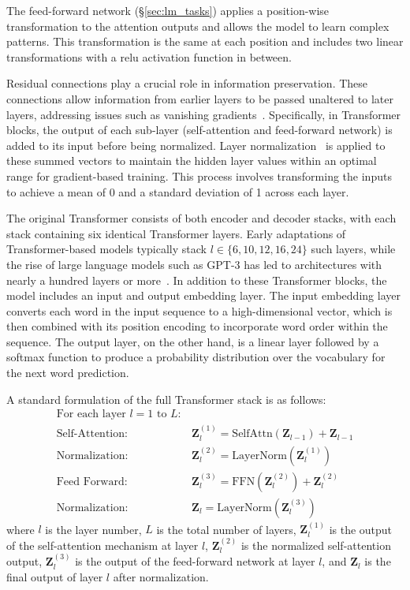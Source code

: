 The feed-forward network (\S\ref{sec:lm_tasks}) applies a position-wise transformation to the attention outputs and allows the model to learn complex patterns. This transformation is the same at each position and includes two linear transformations with a relu activation function in between.

Residual connections play a crucial role in information preservation. These connections allow information from earlier layers to be passed unaltered to later layers, addressing issues such as vanishing gradients~\citep{he2016deep}. Specifically, in Transformer blocks, the output of each sub-layer (self-attention and feed-forward network) is added to its input before being normalized. Layer normalization~\citep{ba2016layer} is applied to these summed vectors to maintain the hidden layer values within an optimal range for gradient-based training. This process involves transforming the inputs to achieve a mean of 0 and a standard deviation of 1 across each layer.


The original Transformer consists of both encoder and decoder stacks, with each stack containing six identical Transformer layers. Early adaptations of Transformer-based models typically stack $l \in \{6, 10,12,16,24\}$ such layers, while the rise of large language models such as GPT-3 has led to architectures with nearly a hundred layers or more~\citep{brown2020language,openai2023gpt4}. In addition to these Transformer blocks, the model includes an input and output embedding layer. The input embedding layer converts each word in the input sequence to a high-dimensional vector, which is then combined with its position encoding to incorporate word order within the sequence. The output layer, on the other hand, is a linear layer followed by a softmax function to produce a probability distribution over the vocabulary for the next word prediction.

A standard formulation of the full Transformer stack is as follows:
\begin{align}
\text{For each layer } l = 1 \text{ to } L:& \nonumber \\
\text{Self-Attention: } & \mathbf{Z}_l^{(1)} = \text{SelfAttn}(\mathbf{Z}_{l-1}) + \mathbf{Z}_{l-1} \nonumber \\
\text{Normalization: } & \mathbf{Z}_l^{(2)} = \text{LayerNorm}(\mathbf{Z}_l^{(1)}) \nonumber \\
\text{Feed Forward: } & \mathbf{Z}_l^{(3)} = \text{FFN}(\mathbf{Z}_l^{(2)}) + \mathbf{Z}_l^{(2)} \nonumber \\
\text{Normalization: } & \mathbf{Z}_l = \text{LayerNorm}(\mathbf{Z}_l^{(3)})
\end{align}
\noindent where $l$ is the layer number, $L$ is the total number of layers, $\mathbf{Z}_l^{(1)}$ is the output of the self-attention mechanism at layer $l$, $\mathbf{Z}_l^{(2)}$ is the normalized self-attention output, $\mathbf{Z}_l^{(3)}$ is the output of the feed-forward network at layer $l$, and $\mathbf{Z}_l$ is the final output of layer $l$ after normalization.

